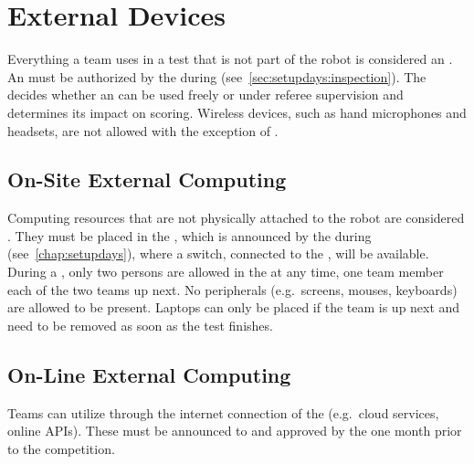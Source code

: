 %
%
\section{External Devices}
\label{sec:rules:externaldevices}
Everything a team uses in a test that is not part of the robot is considered an \ExternalDevice{}.
An \ExternalDevice{} must be authorized by the \TC{} during \RobotInspection{} (see~\ref{sec:setupdays:inspection}).
The  decides whether an \ExternalDevice{} can be used freely or under referee supervision and determines its impact on scoring.
Wireless devices, such as hand microphones and headsets, are not allowed with the exception of \ExternalComputing{}. 

\subsection{On-Site External Computing}
Computing resources that are not physically attached to the robot are considered \ExternalComputing{}.
They must be placed in the \ECRA{}, which is announced by the \TC{} during \SetupDays{} (see~\ref{chap:setupdays}), where a switch, connected to the \ArenaNetwork{} 
, will be available.
During a \Testblock{} 
, only two persons are allowed in the  at any time, one team member each of the two teams up next. No peripherals (e.g.~screens, mouses, keyboards) are allowed to be present. Laptops can only be placed if the team is up next and need to be removed as soon as the test finishes.


\subsection{On-Line External Computing}
\label{sec:rules:onlineexternalcomputing}
Teams can utilize \ExternalComputing{} through the internet connection of the \ArenaNetwork{} (e.g.~cloud services, online APIs). These must be announced to and approved by the \TC{} one month prior to the competition.

